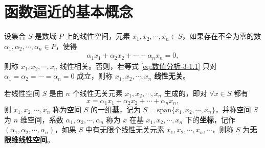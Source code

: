 \documentclass[../../main.tex]{subfiles}%
\begin{document}
\section{函数逼近的基本概念}

\begin{definition}
设集合 \( S \) 是数域 \( P \) 上的线性空间，元素 \( x_1, x_2, \cdots, x_n \in S \)，如果存在不全为零的数 \( \alpha_1, \alpha_2, \cdots, \alpha_n \in P \)，使得
\begin{align}
\alpha_1 x_1 + \alpha_2 x_2 + \cdots + \alpha_n x_n = 0, \label{eq:数值分析-3-1.1}
\end{align}
则称 \( x_1, x_2, \cdots, x_n \) 线性相关。否则，若等式 \eqref{eq:数值分析-3-1.1} 只对 \( \alpha_1 = \alpha_2 = \cdots = \alpha_n = 0 \) 成立，则称 \( x_1, x_2, \cdots, x_n \) \textbf{线性无关}。

若线性空间 \( S \) 是由 \( n \) 个线性无关元素 \( x_1, x_2, \cdots, x_n \) 生成的，即对 \( \forall x \in S \) 都有
\[
x = \alpha_1 x_1 + \alpha_2 x_2 + \cdots + \alpha_n x_n,
\]
则 \( x_1, x_2, \cdots, x_n \) 称为空间 \( S \) 的一组\textbf{基}，记为 \( S = \text{span}\{x_1, x_2, \cdots, x_n\} \)，并称空间 \( S \) 为 \( n \) 维空间，系数 \( \alpha_1, \alpha_2, \cdots, \alpha_n \) 称为 \( x \) 在基 \( x_1, x_2, \cdots, x_n \) 下的\textbf{坐标}，记作 \( (\alpha_1, \alpha_2, \cdots, \alpha_n) \)，如果 \( S \) 中有无限个线性无关元素 \( x_1, x_2, \cdots, x_n, \cdots \)，则称 \( S \) 为\textbf{无限维线性空间}。
\end{definition}
\end{document}
